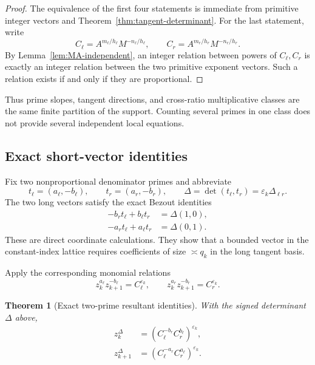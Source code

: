 \documentclass[11pt,oneside]{article}
\newtheorem{theorem}{Theorem}[section]
\theoremstyle{definition}
\theoremstyle{remark}
\newcommand{\eps}{\varepsilon}
\begin{document}
\begin{proof}
The equivalence of the first four statements is immediate from primitive integer vectors and
Theorem~\ref{thm:tangent-determinant}.  For the last statement, write
\[
 C_\ell=A^{m_\ell/h_\ell}M^{-n_\ell/h_\ell},
 \qquad
 C_r=A^{m_r/h_r}M^{-n_r/h_r}.
\]
By Lemma~\ref{lem:MA-independent}, an integer relation between powers of $C_\ell,C_r$ is
exactly an integer relation between the two primitive exponent vectors.  Such a relation
exists if and only if they are proportional.
\end{proof}

Thus prime slopes, tangent directions, and cross-ratio multiplicative classes are the same
finite partition of the support.  Counting several primes in one class does not provide
several independent local equations.

\subsection{Exact short-vector identities}

Fix two nonproportional denominator primes and abbreviate
\begin{equation}
 t_\ell=(a_\ell,-b_\ell),\qquad
 t_r=(a_r,-b_r),\qquad
 \Delta=\det(t_\ell,t_r)=\eps_k\Delta_{\ell r}.
 \label{eq:short-abbrev}
\end{equation}
The two long vectors satisfy the exact Bezout identities
\begin{align}
 -b_r t_\ell+b_\ell t_r&=\Delta(1,0),
 \label{eq:short-e1}\\
 -a_r t_\ell+a_\ell t_r&=\Delta(0,1).
 \label{eq:short-e2}
\end{align}
These are direct coordinate calculations.  They show that a bounded vector in the
constant-index lattice requires coefficients of size $\asymp q_k$ in the long tangent basis.

Apply the corresponding monomial relations
\begin{equation}
 z_k^{a_\ell}z_{k+1}^{-b_\ell}=C_\ell^{\eps_k},
 \qquad
 z_k^{a_r}z_{k+1}^{-b_r}=C_r^{\eps_k}.
 \label{eq:two-monomial-relations}
\end{equation}

\begin{theorem}[Exact two-prime resultant identities]
\label{thm:resultant-identities}
With the signed determinant $\Delta$ above,
\begin{align}
 z_k^{\Delta}
 &=\left(C_\ell^{-b_r}C_r^{b_\ell}\right)^{\eps_k},
 \label{eq:resultant-zk}\\
 z_{k+1}^{\Delta}
 &=\left(C_\ell^{-a_r}C_r^{a_\ell}\right)^{\eps_k}.
 \label{eq:resultant-zkp1}
\end{align}
\end{theorem}
\end{document}

